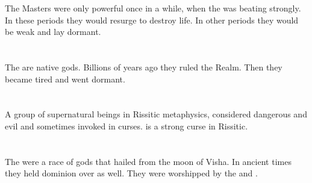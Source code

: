 The Masters were only powerful once in a while, when the  was beating strongly.
In these periods they would resurge to destroy life.
In other periods they would be weak and lay dormant. 















\section{\Krakens}
The \krakens{} are native \Miithian{} gods. 
Billions of years ago they ruled the Realm. 
Then they became tired and went dormant. 















\section{\Maskim}
A group of supernatural beings in Rissitic metaphysics, considered dangerous and evil and sometimes invoked in curses. 
 is a strong curse in Rissitic.















\section{\Moongods}
The \moongods were a race of gods that hailed from the moon of Visha. 
In ancient times they held dominion over \Miith as well.
They were worshipped by the  and .









